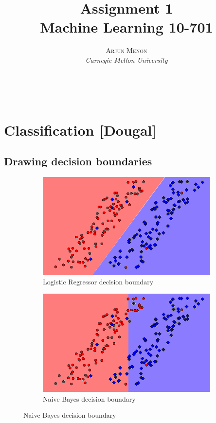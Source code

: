 \documentclass[letterpaper,10pt]{article} %
\title{\textbf{Assignment 1}\\ %
Machine Learning 10-701} %
\author{\textsc{Arjun Menon} %
\\{\textit{Carnegie Mellon University}}} %
\makeatletter
\renewcommand{\maketitle}{ %
\begin{flushright} %
{\LARGE\@title} %

{\large\@author} %
\\\@date %

\end{flushright}
}
\makeatother
\begin{document}
\maketitle %

\section{Classification [Dougal]}
\subsection{Drawing decision boundaries}

\begin{figure}[h]
\centering
\begin{subfigure}[b]{\textwidth}
\includegraphics[width=\textwidth]{handout/q3-1-logistic}
\caption{Logistic Regressor decision boundary}
\label{fig:log1}
\end{subfigure}%

\begin{subfigure}[b]{\textwidth}
\includegraphics[width=\textwidth]{handout/q3-1-bayes}
\caption{Naive Bayes decision boundary}
\label{fig:bayes1}
\end{subfigure}


\end{figure}
\end{document}
